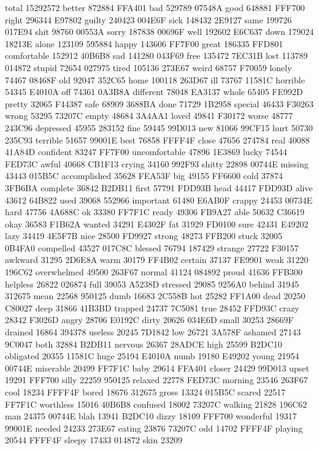 total 15292572 better 872884 FFA401 bad 529789 07548A good 648881 FFF700
right 296344 E97802 guilty 240423 004E6F sick 148432 2E9127 same 199726
017E94 shit 98760 00553A sorry 187838 00696F well 192602 E6C637 down
179024 18213E alone 123109 595884 happy 143606 FF7F00 great 186335
FFD801 comfortable 152912 40B6B8 sad 141280 043F69 free 135472 7EC31B
lost 113789 014872 stupid 72654 027975 tired 105136 273E67 weird 68757
F70059 lonely 74467 08468F old 92047 352C65 home 100118 263D67 ill
73767 11581C horrible 54345 E4010A off 74361 0A3B8A different 78048
EA3137 whole 65405 FE992D pretty 32065 F44387 safe 68909 3688BA done
71729 1B2958 special 46433 F30263 wrong 53295 73207C empty 48684 3A4AA1
loved 49841 F30172 worse 48777 243C96 depressed 45955 283152 fine 59445
99D013 new 81066 99CF15 hurt 50730 235C93 terrible 51657 99001E best
76858 FFFF4F close 47656 274784 real 40088 41A84D confident 83247
FF7F00 uncomfortable 47896 1E3869 lucky 74544 FED73C awful 40668 CB1F13
crying 34160 992F93 shitty 22898 00744E missing 43443 015B5C
accomplished 35628 FEA53F big 49155 FF6600 cold 37874 3FB6BA complete
36842 B2DB11 first 57791 FDD93B head 44417 FDD93D alive 43612 64B822
used 39068 552966 important 61480 E6AB0F crappy 24453 00734E hard 47756
4A688C ok 33380 FF7F1C ready 49306 FB9A27 able 50632 C36619 okay 36583
F1B62A wanted 34291 E4302F fat 31929 FD0100 sure 42431 E49202 lazy
34419 4E5F7B nice 28500 FD9927 strong 48273 FFB200 stuck 32005 0B4FA0
compelled 43527 017C8C blessed 76794 187429 strange 27722 F30157
awkward 31295 2D6E8A warm 30179 FF4B02 certain 37137 FE9901 weak 31220
196C62 overwhelmed 49500 263F67 normal 41124 084892 proud 41636 FFB300
helpless 26822 026874 full 39053 A5238D stressed 29085 9256A0 behind
31945 312675 mean 22568 950125 dumb 16683 2C558B hot 25282 FF1A00 dead
20250 C80027 deep 31866 41B3BD trapped 24737 7C5081 true 28452 FFD93C
crazy 28342 F3026D angry 28706 E0192C dirty 20626 034E6D small 30253
28669F drained 16864 394378 useless 20245 7D1842 low 26721 3A578F
ashamed 27143 9C0047 both 32884 B2DB11 nervous 26367 28ADCE high 25599
B2DC10 obligated 20355 11581C huge 25194 E4010A numb 19180 E49202 young
21954 00744E miserable 20499 FF7F1C baby 29614 FFA401 closer 24429
99D013 upset 19291 FFF700 silly 22259 950125 relaxed 22778 FED73C
morning 23546 263F67 cool 18234 FFFF4F bored 18676 312675 gross 13324
015B5C scared 22517 FF7F1C worthless 15016 40B6B8 confused 18002 73207C
walking 21828 196C62 man 24375 00744E blah 13941 B2DC10 dizzy 18109
FFF700 wonderful 19317 99001E needed 24233 273E67 eating 23876 73207C
odd 14702 FFFF4F playing 20544 FFFF4F sleepy 17433 014872 skin 23209
